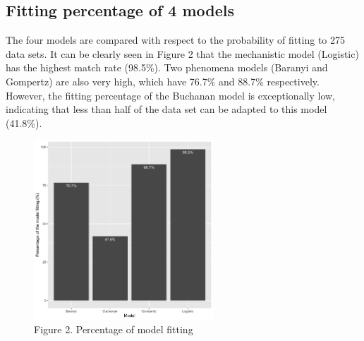 \documentclass[11pt]{article}
\begin{document}
\subsection{Fitting percentage of 4 models}
The four models are compared with respect to the probability of fitting to 275 data sets. It can be clearly seen in Figure 2 that the mechanistic model (Logistic) has the highest match rate (98.5\%). Two phenomena models (Baranyi and Gompertz) are also very high, which have 76.7\% and 88.7\% respectively. However, the fitting percentage of the Buchanan model is exceptionally low, indicating that less than half of the data set can be adapted to this model (41.8\%). 
		\begin{figure}[h]
		\centering
		\includegraphics[width = 0.6\textwidth]{../Results/Fitting_percentage.png}
		      \caption{Figure 2. Percentage of model fitting}
	    \end{figure}
	    
\end{document}
